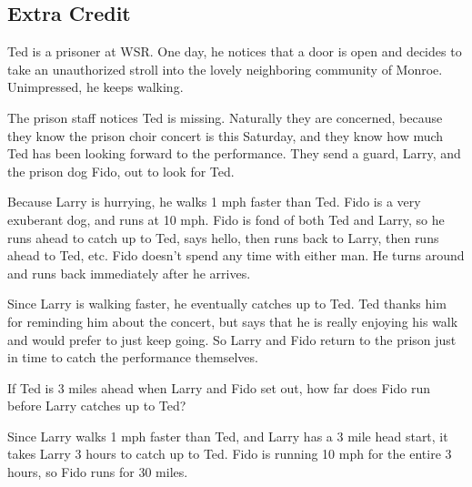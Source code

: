 \documentclass[fleqn,addpoints]{exam}
\begin{document}
\begin{questions}
\section{Extra Credit}

\question

Ted is a prisoner at WSR.  One day, he notices that a door is open and decides to take an unauthorized stroll into the
lovely neighboring community of Monroe.  Unimpressed, he keeps walking.

The prison staff notices Ted is missing.  Naturally they are concerned, because they know the prison choir concert is
this Saturday, and they know how much Ted has been looking forward to the performance.  They send a guard, Larry, and the
prison dog Fido, out to look for Ted.

Because Larry is hurrying, he walks 1 mph faster than Ted.  Fido is a very exuberant dog, and runs at 10 mph.  Fido is
fond of both Ted and Larry, so he runs ahead to catch up to Ted, says hello, then runs back to Larry, then runs ahead to
Ted, etc.  Fido doesn't spend any time with either man.  He turns around and runs back immediately after he arrives.

Since Larry is walking faster, he eventually catches up to Ted.  Ted thanks him for reminding him about the concert, but
says that he is really enjoying his walk and would prefer to just keep going.  So Larry and Fido return to the prison
just in time to catch the performance themselves.

If Ted is 3 miles ahead when Larry and Fido set out, how far does Fido run before Larry catches up to Ted?

\begin{solution}

Since Larry walks 1 mph faster than Ted, and Larry has a 3 mile head start, it takes Larry 3 hours to catch up to Ted.
Fido is running 10 mph for the entire 3 hours, so Fido runs for 30 miles.

\end{solution}

\end{questions}
\end{document}
